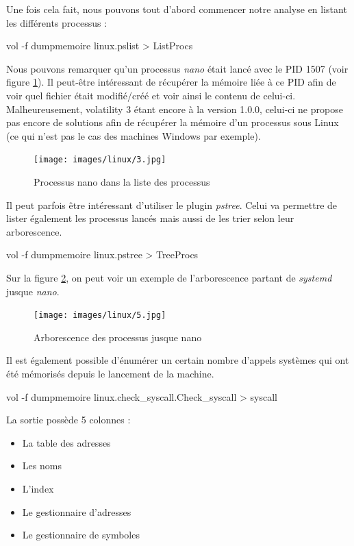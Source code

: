 \documentclass[a4paper]{article}
\begin{document}
Une fois cela fait, nous pouvons tout d'abord commencer notre analyse en listant les différents processus :
\begin{example}
    vol -f dumpmemoire linux.pslist > ListProcs
\end{example}

Nous pouvons remarquer qu'un processus \emph{nano} était lancé avec le PID 1507 (voir figure \ref{fig:nano}). Il peut-être intéressant de récupérer la mémoire liée à ce PID afin de voir quel fichier était modifié/créé et voir ainsi le contenu de celui-ci. Malheureusement, volatility 3 étant encore à la version 1.0.0, celui-ci ne propose pas encore de solutions afin de récupérer la mémoire d'un processus sous Linux (ce qui n'est pas le cas des machines Windows par exemple).

\begin{figure}[H]
    \centering
    \texttt{[image: images/linux/3.jpg]}
    \caption{Processus nano dans la liste des processus}
    \label{fig:nano}
\end{figure}

Il peut parfois être intéressant d'utiliser le plugin \emph{pstree}. Celui va permettre de lister également les processus lancés mais aussi de les trier selon leur arborescence.
\begin{example}
    vol -f dumpmemoire linux.pstree > TreeProcs
\end{example}

Sur la figure \ref{fig:pstree}, on peut voir un exemple de l'arborescence partant de \emph{systemd} jusque \emph{nano}.

\begin{figure}[H]
    \centering
    \texttt{[image: images/linux/5.jpg]}
    \caption{Arborescence des processus jusque nano}
    \label{fig:pstree}
\end{figure}

Il est également possible d'énumérer un certain nombre d'appels systèmes qui ont été mémorisés depuis le lancement de la machine.
\begin{example}
    vol -f dumpmemoire linux.check\_syscall.Check\_syscall > syscall
\end{example}

La sortie possède 5 colonnes :
\begin{itemize}
    \item La table des adresses
    \item Les noms
    \item L'index
    \item Le gestionnaire d'adresses
    \item Le gestionnaire de symboles\\\\
\end{itemize}
\end{document}
